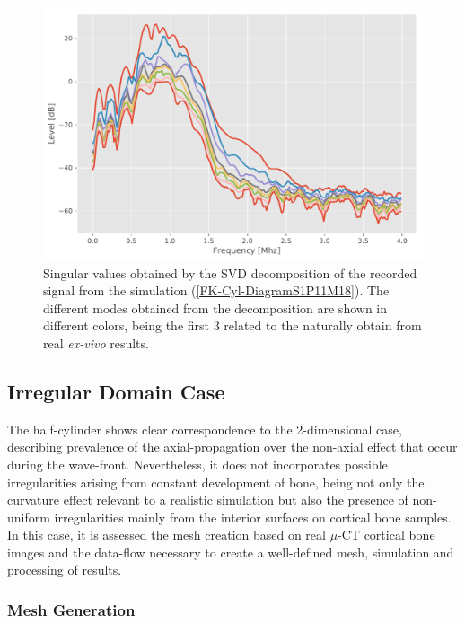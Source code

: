 \begin{figure}[!h]  
	\centering
	\includegraphics[scale=.6]{images/ClusterSim/3DCylTimeP11TransIsoFKW18_SV.pdf}
	\caption{Singular values obtained by the SVD decomposition of the recorded signal from the simulation (\ref{FK-Cyl-DiagramS1P11M18}). The different modes obtained from the decomposition are shown in different colors, being the first 3 related to the naturally obtain from real \textit{ex-vivo} results.}
	\label{SVD-Cyl-S1P11M18}
\end{figure}


\subsection{Irregular Domain Case}
The half-cylinder shows clear correspondence to the 2-dimensional case, describing prevalence of the axial-propagation over the non-axial effect that occur during the wave-front. Nevertheless, it does not incorporates possible irregularities arising from constant development of bone, being not only the curvature effect relevant to a realistic simulation but also the presence of non-uniform irregularities mainly from the interior surfaces on cortical bone samples. In this case, it is assessed the mesh creation based on real $\mu$-CT cortical bone images and the data-flow necessary to create a well-defined mesh, simulation and processing of results.

\subsubsection{Mesh Generation}

